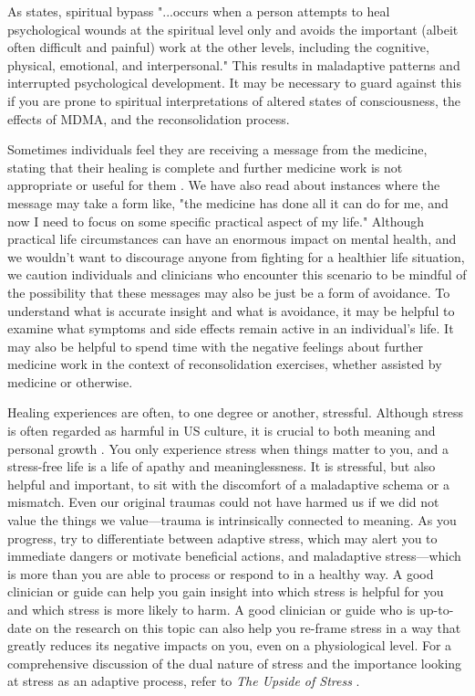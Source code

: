 \documentclass[12pt,letterpaper]{book}
\begin{document}
As \textcite{cashwell2007Bypass} states, spiritual bypass "...occurs when a person attempts to heal psychological wounds at the spiritual level only and avoids the important (albeit often difficult and painful) work at the other levels, including the cognitive, physical, emotional, and interpersonal." This results in maladaptive patterns and interrupted psychological development. It may be necessary to guard against this if you are prone to spiritual interpretations of altered states of consciousness, the effects of MDMA, and the reconsolidation process.

Sometimes individuals feel they are receiving a message from the medicine, stating that their healing is complete and further medicine work is not appropriate or useful for them \cite{razviDissociation}. We have also read about instances where the message may take a form like, "the medicine has done all it can do for me, and now I need to focus on some specific practical aspect of my life." Although practical life circumstances can have an enormous impact on mental health, and we wouldn't want to discourage anyone from fighting for a healthier life situation, we caution individuals and clinicians who encounter this scenario to be mindful of the possibility that these messages may also be just be a form of avoidance. To understand what is accurate insight and what is avoidance, it may be helpful to examine what symptoms and side effects remain active in an individual's life. It may also be helpful to spend time with the negative feelings about further medicine work in the context of reconsolidation exercises, whether assisted by medicine or otherwise.

Healing experiences are often, to one degree or another, stressful. Although stress is often regarded as harmful in US culture, it is crucial to both meaning and personal growth \cite{mcgonigalStress}. You only experience stress when things matter to you, and a stress-free life is a life of apathy and meaninglessness. It is stressful, but also helpful and important, to sit with the discomfort of a maladaptive schema or a mismatch. Even our original traumas could not have harmed us if we did not value the things we value—trauma is intrinsically connected to meaning. As you progress, try to differentiate between adaptive stress, which may alert you to immediate dangers or motivate beneficial actions, and maladaptive stress—which is more than you are able to process or respond to in a healthy way. A good clinician or guide can help you gain insight into which stress is helpful for you and which stress is more likely to harm. A good clinician or guide who is up-to-date on the research on this topic can also help you re-frame stress in a way that greatly reduces its negative impacts on you, even on a physiological level. For a comprehensive discussion of the dual nature of stress and the importance looking at stress as an adaptive process, refer to \textit{The Upside of Stress} \cite{mcgonigalStress}.
\end{document}
